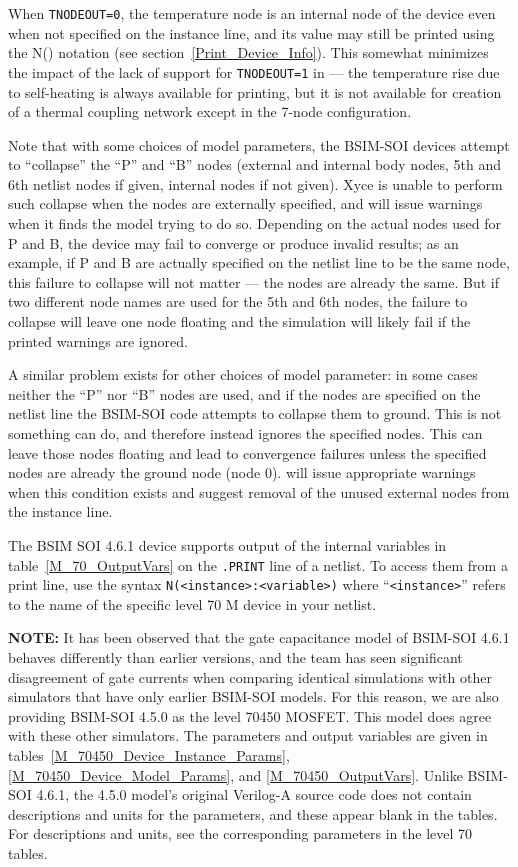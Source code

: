 When \texttt{TNODEOUT=0}, the temperature node is an internal node of
the device even when not specified on the instance line, and its value
may still be printed using the N() notation (see
section~\ref{Print_Device_Info}).  This somewhat minimizes the impact
of the lack of support for \texttt{TNODEOUT=1} in \Xyce{} --- the
temperature rise due to self-heating is always available for printing,
but it is not available for creation of a thermal coupling network
except in the 7-node configuration.

Note that with some choices of model parameters, the BSIM-SOI devices
attempt to ``collapse'' the ``P'' and ``B'' nodes (external and
internal body nodes, 5th and 6th netlist nodes if given, internal
nodes if not given).  Xyce is unable to perform such collapse when the
nodes are externally specified, and will issue warnings when it finds
the model trying to do so.  Depending on the actual nodes used for P
and B, the device may fail to converge or produce invalid results; as
an example, if P and B are actually specified on the netlist line to
be the same node, this failure to collapse will not matter --- the
nodes are already the same.  But if two different node names are used
for the 5th and 6th nodes, the failure to collapse will leave one node
floating and the simulation will likely fail if the printed warnings
are ignored.

A similar problem exists for other choices of model parameter: in some
cases neither the ``P'' nor ``B'' nodes are used, and if the nodes are
specified on the netlist line the BSIM-SOI code attempts to collapse
them to ground.  This is not something \Xyce{} can do, and therefore
instead \Xyce{} ignores the specified nodes.  This can leave those
nodes floating and lead to convergence failures unless the specified
nodes are already the ground node (node 0).  \Xyce{} will issue
appropriate warnings when this condition exists and suggest removal of
the unused external nodes from the instance line.

The BSIM SOI 4.6.1 device supports output of the internal variables in
table~\ref{M_70_OutputVars} on the \texttt{.PRINT} line of a netlist.
To access them from a print line, use the syntax
\texttt{N(<instance>:<variable>)} where ``\texttt{<instance>}'' refers to the
name of the specific level 70 M device in your netlist.

\textbf{NOTE:} It has been observed that the gate capacitance model of
BSIM-SOI 4.6.1 behaves differently than earlier versions, and the team
has seen significant disagreement of gate currents when comparing
identical simulations with other simulators that have only earlier
BSIM-SOI models.  For this reason, we are also providing BSIM-SOI
4.5.0 as the level 70450 MOSFET.  This model does agree with these
other simulators.  The parameters and output variables are given in
tables~\ref{M_70450_Device_Instance_Params},
\ref{M_70450_Device_Model_Params}, and \ref{M_70450_OutputVars}.
Unlike BSIM-SOI 4.6.1, the 4.5.0 model's original Verilog-A source
code does not contain descriptions and units for the parameters, and
these appear blank in the tables.  For descriptions and units, see the
corresponding parameters in the level 70 tables.

